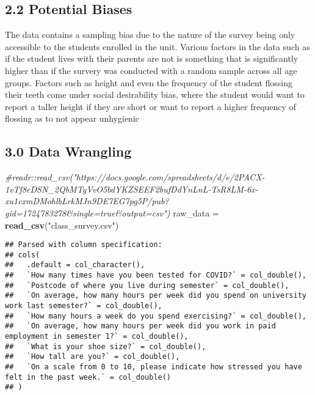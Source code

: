 \documentclass[
]{article}
\newenvironment{Shaded}{\begin{snugshade}}{\end{snugshade}}
\newcommand{\CommentTok}[1]{\textcolor[rgb]{0.56,0.35,0.01}{\textit{#1}}}
\newcommand{\KeywordTok}[1]{\textcolor[rgb]{0.13,0.29,0.53}{\textbf{#1}}}
\newcommand{\NormalTok}[1]{#1}
\newcommand{\StringTok}[1]{\textcolor[rgb]{0.31,0.60,0.02}{#1}}
\begin{document}
\hypertarget{potential-biases}{%
\subsection{2.2 Potential Biases}\label{potential-biases}}

The data contains a sampling bias due to the nature of the survey being
only accessible to the students enrolled in the unit. Various factors in
the data such as if the student lives with their parents are not is
something that is significantly higher than if the survery was conducted
with a random sample across all age groups. Factors such as height and
even the frequency of the student flossing their teeth come under social
desirability bias, where the student would want to report a taller
height if they are short or want to report a higher frequency of
flossing as to not appear unhygienic

\hypertarget{data-wrangling}{%
\subsection{3.0 Data Wrangling}\label{data-wrangling}}

\begin{Shaded}
\begin{Highlighting}[]
\CommentTok{#readr::read_csv("https://docs.google.com/spreadsheets/d/e/2PACX-1vTf8eDSN_2QbMTyVvO5bdYKZSEEF2bufDdYnLnL-TsR8LM-6x-xu1cxmDMohlbLrkMJn9DE7EG7pg5P/pub?gid=1724783278&single=true&output=csv")}
\NormalTok{raw_data =}\StringTok{ }\KeywordTok{read_csv}\NormalTok{(}\StringTok{"class_survey.csv"}\NormalTok{)}
\end{Highlighting}
\end{Shaded}

\begin{verbatim}
## Parsed with column specification:
## cols(
##   .default = col_character(),
##   `How many times have you been tested for COVID?` = col_double(),
##   `Postcode of where you live during semester` = col_double(),
##   `On average, how many hours per week did you spend on university work last semester?` = col_double(),
##   `How many hours a week do you spend exercising?` = col_double(),
##   `On average, how many hours per week did you work in paid employment in semester 1?` = col_double(),
##   `What is your shoe size?` = col_double(),
##   `How tall are you?` = col_double(),
##   `On a scale from 0 to 10, please indicate how stressed you have felt in the past week.` = col_double()
## )
\end{verbatim}
\end{document}

